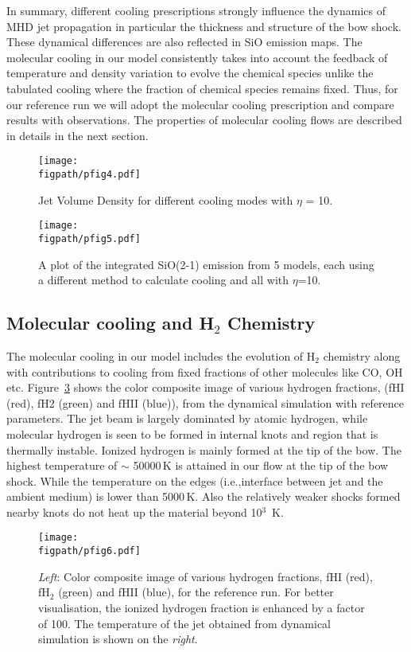 \documentclass[useAMS,usenatbib]{mn2e}
\newcommand{\figpath}{/home/phybva/SiOJets_New/PAPER/NEWFIGS}
\begin{document}
In summary, different cooling prescriptions strongly influence the
dynamics of MHD jet propagation in particular the thickness and
structure of the bow shock. These dynamical differences are
also reflected in SiO emission maps. The molecular cooling in our
model consistently takes into account the feedback of temperature and
density variation to evolve the chemical species unlike the tabulated cooling
where the fraction of chemical species remains fixed. Thus, for our reference
run we will adopt the molecular cooling prescription and compare
results with observations. The properties of
molecular cooling flows are described in details in the next section.

\begin{figure*}
 \texttt{[image: \\figpath/pfig4.pdf]}%
 \caption{Jet Volume Density for different cooling modes with
   $\eta$ = 10.}
\label{fig:coolcmpdyn}
\end{figure*}

\begin{figure*}
 \texttt{[image: \\figpath/pfig5.pdf]}%
 \caption{A plot of the integrated SiO(2-1) emission from 5 models, 
each using a different method to calculate cooling and all with $\eta$=10.}
\label{fig:coolcmpsio} 
\end{figure*}


\subsection{Molecular cooling and H$_2$ Chemistry}
The molecular cooling in our
model includes the evolution of H$_2$ chemistry along with
contributions to cooling from fixed fractions of other molecules like
CO, OH etc. Figure~\ref{fig:Hfracsim} shows the color composite image
of various hydrogen fractions, (fHI (red), fH2 (green) and fHII
(blue)), from the dynamical simulation with
reference parameters. The jet beam is largely dominated by atomic
hydrogen, while molecular hydrogen is seen to be formed in internal
knots and region that is thermally instable. 
Ionized hydrogen is mainly formed at the tip of the bow. 
The highest temperature of $\sim$ 50000\,K is attained in our flow at the
tip of the bow shock. While the temperature on the edges (i.e.,interface between
jet and the ambient medium) is lower than 5000\,K. Also the relatively
weaker shocks formed nearby knots do not heat up the material beyond
10$^{3}$\, K. 
%

\begin{figure}
 \texttt{[image: \\figpath/pfig6.pdf]}%
 \caption{{\it{Left}}: Color composite image of various hydrogen
   fractions, fHI (red), fH$_{2}$ (green) and fHII (blue), for the
   reference run. For better visualisation, the ionized hydrogen
   fraction is enhanced by a factor of 100. The temperature of the jet
 obtained from dynamical simulation is shown on the {\it{right}}.}
\label{fig:Hfracsim}
\end{figure}
\end{document}
